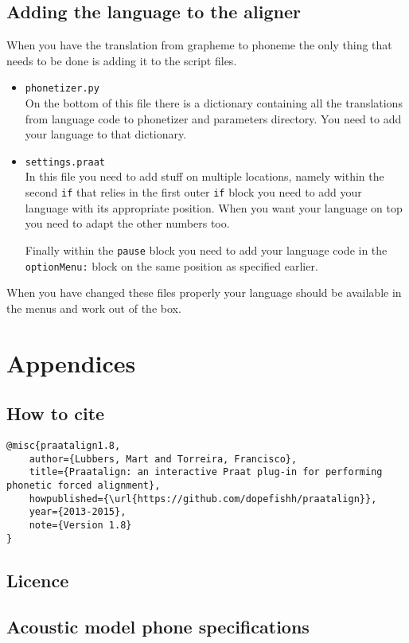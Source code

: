 \section{Adding the language to the aligner}
When you have the translation from grapheme to phoneme the only thing that
needs to be done is adding it to the script files.
\begin{itemize}
	\item \texttt{phonetizer.py}\\
		On the bottom of this file there is a dictionary containing all the
		translations from language code to phonetizer and parameters directory. You
		need to add your language to that dictionary.
	\item \texttt{settings.praat}\\
		In this file you need to add stuff on multiple locations, namely within the
		second \texttt{if} that relies in the first outer \texttt{if} block you
		need to add your language with its appropriate position. When you want your
		language on top you need to adapt the other numbers too.

		Finally within the \texttt{pause} block you need to add your language code
		in the \texttt{optionMenu:} block on the same position as specified
		earlier.
\end{itemize}
When you have changed these files properly your language should be available in
the menus and work out of the box.

\chapter{Appendices}
\section{How to cite}
\begin{lstlisting}[caption={Bibtex snippet}]
@misc{praatalign1.8,
	author={Lubbers, Mart and Torreira, Francisco},
	title={Praatalign: an interactive Praat plug-in for performing phonetic forced alignment},
	howpublished={\url{https://github.com/dopefishh/praatalign}},
	year={2013-2015},
	note={Version 1.8}
}
\end{lstlisting}

\section{Licence}


\section{Acoustic model phone specifications}\label{sec:models}
